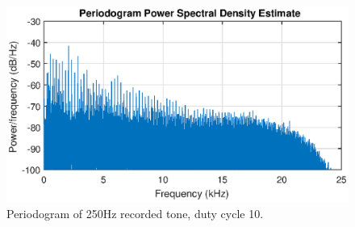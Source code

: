 \begin{figure}[H]
    \centering
    \includegraphics[trim={0cm 1.6cm 0cm 2cm},clip,width=\textwidth]{img/akustisk/Periodogram_250Hz-10.eps}
    \caption{Periodogram of 250Hz recorded tone, duty cycle 10.}
    \label{fig:period_250-10}
\end{figure}

